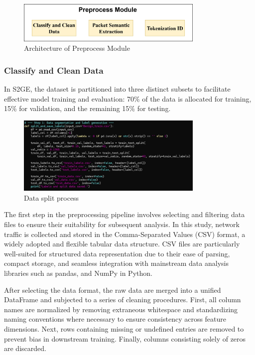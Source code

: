 \begin{ZhChapter}
    \begin{figure}[htbp]
        \centering
        \includegraphics[width = 0.8\textwidth]{image/preprocessModule.png}
        \caption{Architecture of Preprocess Module }
        \label{fig:preprocessModule}
    \end{figure}


    \subsubsection{Classify and Clean Data}
    In S2GE, the dataset is partitioned into three distinct subsets to facilitate effective model training and evaluation: 70\% of the data is allocated for training, 15\% for validation, and the remaining 15\% for testing.
    \begin{figure}[htbp]
        \centering
        \includegraphics[width = 0.8\textwidth]{image/datasplit.jpg}
        \caption{Data split process}
        \label{fig:preprocessModule}
    \end{figure}

    The first step in the preprocessing pipeline involves selecting and filtering data files to ensure their suitability for subsequent analysis. In this study, network traffic is collected and stored in the Comma-Separated Values (CSV) format, a widely adopted and flexible tabular data structure. CSV files are particularly well-suited for structured data representation due to their ease of parsing, compact storage, and seamless integration with mainstream data analysis libraries such as pandas, and NumPy in Python.

    After selecting the data format, the raw data are merged into a unified DataFrame and subjected to a series of cleaning procedures. First, all column names are normalized by removing extraneous whitespace and standardizing naming conventions where necessary to ensure consistency across feature dimensions. Next, rows containing missing or undefined entries are removed to prevent bias in downstream training. Finally, columns consisting solely of zeros are discarded.


\end{ZhChapter}
